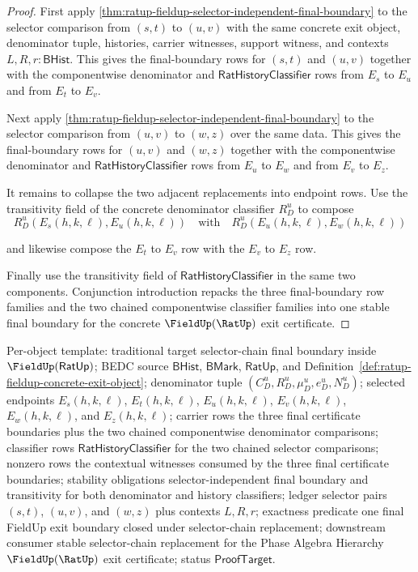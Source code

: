 \begin{proof}
First apply
\autoref{thm:ratup-fieldup-selector-independent-final-boundary} to the
selector comparison from $(s,t)$ to $(u,v)$ with the same concrete exit object,
denominator tuple, histories, carrier witnesses, support witness, and contexts
$L,R,r:\mathsf{BHist}$. This gives the final-boundary rows for $(s,t)$ and
$(u,v)$ together with the componentwise denominator and
$\mathsf{RatHistoryClassifier}$ rows from $E_s$ to $E_u$ and from $E_t$ to
$E_v$.

Next apply
\autoref{thm:ratup-fieldup-selector-independent-final-boundary} to the
selector comparison from $(u,v)$ to $(w,z)$ over the same data. This gives the
final-boundary rows for $(u,v)$ and $(w,z)$ together with the componentwise
denominator and $\mathsf{RatHistoryClassifier}$ rows from $E_u$ to $E_w$ and
from $E_v$ to $E_z$.

It remains to collapse the two adjacent replacements into endpoint rows. Use
the transitivity field of the concrete denominator classifier $R_D^u$ to
compose
$$
R_D^u(E_s(h,k,\ell),E_u(h,k,\ell))
\quad\text{with}\quad
R_D^u(E_u(h,k,\ell),E_w(h,k,\ell))
$$

and likewise compose the $E_t$ to $E_v$ row with the $E_v$ to $E_z$ row.

Finally use the transitivity field of $\mathsf{RatHistoryClassifier}$ in the
same two components. Conjunction introduction repacks the three
final-boundary row families and the two chained componentwise classifier
families into one stable final boundary for the concrete
$\FieldUp(\RatUp)$ exit certificate.
\end{proof}

Per-object template: traditional target selector-chain final boundary inside
$\FieldUp(\mathsf{RatUp})$; BEDC source $\mathsf{BHist}$, $\mathsf{BMark}$,
$\mathsf{RatUp}$, and
Definition~\ref{def:ratup-fieldup-concrete-exit-object}; denominator tuple
$(C_D^u,R_D^u,\mu_D^u,e_D^u,N_D^u)$; selected endpoints
$E_s(h,k,\ell)$, $E_t(h,k,\ell)$, $E_u(h,k,\ell)$, $E_v(h,k,\ell)$,
$E_w(h,k,\ell)$, and $E_z(h,k,\ell)$; carrier rows the three final certificate
boundaries plus the two chained componentwise denominator comparisons;
classifier rows $\mathsf{RatHistoryClassifier}$ for the two chained selector
comparisons; nonzero rows the contextual witnesses consumed by the three final
certificate boundaries; stability obligations selector-independent final
boundary and transitivity for both denominator and history classifiers; ledger
selector pairs $(s,t)$, $(u,v)$, and $(w,z)$ plus contexts $L,R,r$; exactness
predicate one final FieldUp exit boundary closed under selector-chain
replacement; downstream consumer stable selector-chain replacement for the
Phase Algebra Hierarchy $\FieldUp(\RatUp)$ exit certificate; status
$\mathsf{ProofTarget}$.
